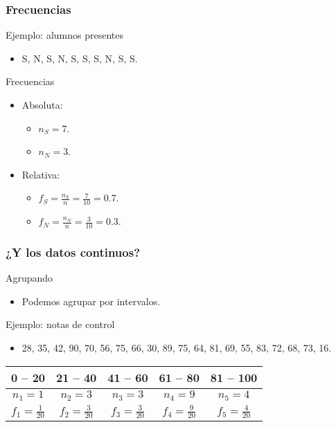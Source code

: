 \documentclass[table]{beamer}
\begin{document}
\begin{frame}
    \frametitle{Frecuencias}
    \begin{exampleblock}{Ejemplo: alumnos presentes}
        \begin{itemize}
            \item S, N, S, N, S, S, S, N, S, S.
        \end{itemize}
    \end{exampleblock}
    \begin{block}{Frecuencias}
        \begin{itemize}
            \item Absoluta:
                \begin{itemize}
                    \item $n_{S} = 7$.
                    \item $n_{N} = 3$.
                \end{itemize}
            \item Relativa:
                \begin{itemize}
                    \item $f_{S} = \frac{n_{S}}{n} = \frac{7}{10} = 0.7$.
                    \item $f_{N} = \frac{n_{N}}{n} = \frac{3}{10} = 0.3$.
                \end{itemize}
        \end{itemize}
    \end{block}
\end{frame}

\begin{frame}
    \frametitle{¿Y los datos continuos?}
    \begin{block}{Agrupando}
        \begin{itemize}
            \item Podemos agrupar por intervalos.
        \end{itemize}
    \end{block}
    \begin{exampleblock}{Ejemplo: notas de control}
        \begin{itemize}
            \item 28, 35, 42, 90, 70, 56, 75, 66, 30, 89, 75, 64, 81, 69, 55, 83, 72, 68, 73, 16.
        \end{itemize}
        \begin{center}
            \begin{tabular}{c|c|c|c|c}
                0 -- 20 & 21 -- 40 & 41 -- 60 & 61 -- 80 & 81 -- 100 \\
                \hline
                $n_{1} = 1$ & $n_{2} = 3$ & $n_{3} = 3$ & $n_{4} = 9$ & $n_{5} = 4$ \\
                \hline
                $f_{1} = \frac{1}{20}$ & $f_{2} = \frac{3}{20}$ & $f_{3} = \frac{3}{20}$ & $f_{4} = \frac{9}{20}$ & $f_{5} = \frac{4}{20}$ \\
            \end{tabular}
        \end{center}
    \end{exampleblock}
\end{frame}
\end{document}
